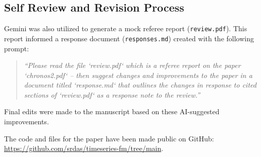 \documentclass[twocolumn]{article}
\begin{document}
\subsection*{Self Review and Revision Process}
Gemini was also utilized to generate a mock referee report (\texttt{review.pdf}). This report informed a response document (\texttt{responses.md}) created with the following prompt: 
\begin{quote}
    \textit{``Please read the file ‘review.pdf‘ which is a referee report on the paper ‘chronos2.pdf‘ – then suggest changes and improvements to the paper in a document titled ‘response.md‘ that outlines the changes in response to cited sections of ‘review.pdf‘ as a response note to the review.''}
\end{quote}
Final edits were made to the manuscript based on these AI-suggested improvements. 

The code and files for the paper have been made public on GitHub: \url{https://github.com/srdas/timeseries-fm/tree/main}.
\end{document}
